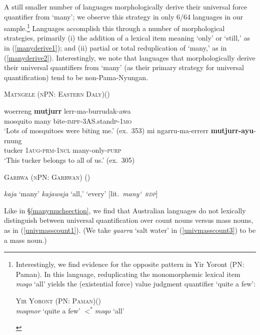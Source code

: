 \documentclass[12pt,egregdoesnotlikesansseriftitles]{scrartcl}
\begin{document}
 A still smaller number of languages morphologically derive their universal force quantifier from `many'; we observe this strategy in only 6/64 languages in our sample.\footnote{Interestingly, we find evidence for the opposite pattern in  Yir Yoront (PN: Paman). In this language, reduplicating the monomorphemic lexical item \textit{moqo} `all' yields the (existential force) value judgment quantifier `quite a few':

\vspace{-2mm}

\begin{exe}
  \ex \textsc{Yir Yoront (PN: Paman)}\hfill (\citealt[375]{alpher73})\\
  \textit{\charis moqmor} `quite a few' $<^*$\textit{\charis moqo} `all'
\end{exe}}  Languages accomplish this  through a number of morphological strategies, primarily (i) the addition of a lexical item meaning `only' or `still,' as in (\ref{manyderive1});  and (ii) partial or total reduplication of `many,' as in (\ref{manyderive2}). Interestingly, we note that languages that morphologically derive their universal quantifiers from `many' (as their primary strategy for universal quantification) tend to be non-Pama-Nyungan.


\begin{exe}
  \ex  \textsc{Matngele (nPN: Eastern Daly)}\hfill (\citealt{zandvoort99}) \label{manyderive1}
  \begin{xlist}
    \ex \gll woerreng \textbf{mutjurr} lerr-ma-burrudak-awa\\
    mosquito many bite-\textsc{impf}-3AS.stand\textsc{p}-1\textsc{mo}\\
    \glt `Lots of mosquitoes were biting me.' (ex.~353) %
    \ex \gll mi ngarru-ma-errerr \textbf{mutjurr-ayu}-rnung\\
    tucker 1\textsc{aug-prm}-1\textsc{ncl} many-only-\textsc{purp}\\
    \glt `This tucker belongs to all of us.' (ex.~305)
    \end{xlist}
\ex \textsc{Garrwa (nPN: Garrwan)} \hfill(\citealt[54]{mushin12}) \label{manyderive2}
  \begin{xlist}
    \ex \textit{kaja} `many'
    \ex \textit{kajawaja}  `all,' `every' [lit.\ \textit{many\char`~\textsc{rdp}}]
  \end{xlist}
\end{exe}

Like in \S\ref{manymuchsection}, we find that Australian languages do not lexically distinguish between universal quantification over count nouns versus mass nouns, as in (\ref{univmasscount1}). (We take \textit{gaarra} `salt water' in (\ref{univmasscount3}) to be a mass noun.)
\end{document}
